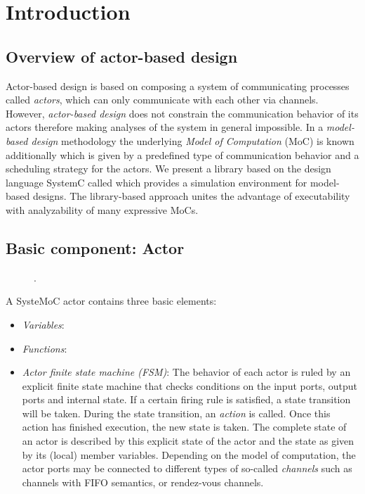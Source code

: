
\chapter{Introduction}

\section{Overview of actor-based design}
Actor-based design is based on composing a system of communicating processes called \emph{actors}, which can only communicate with each other via channels.
However, \emph{actor-based design} does not constrain the communication behavior of its actors therefore making analyses of the system in general impossible.
In a \emph{model-based design} methodology the underlying \emph{Model of Computation} (MoC) is known additionally which is given by a predefined type of communication behavior and a scheduling strategy for the actors.
We present a library based on the design language SystemC called \SysteMoC{} which provides a simulation environment for model-based designs.
The library-based approach unites the advantage of executability with analyzability of many expressive MoCs.

\section{Basic component: Actor}

\begin{figure}[h]
\centering

\caption {.
}
\label{fig:actor-scheme}
\end{figure}

A SysteMoC actor contains three basic elements:
\begin{itemize}
\item {\em Variables}:
\item {\em Functions}:
\item {\em Actor finite state machine (FSM)}:
The behavior of each actor is ruled 
by an explicit finite state machine that checks conditions on the input ports, 
output ports and internal state. If a certain firing rule is satisfied, 
a state transition will be taken. During the state transition, an {\em action}
is called. Once this action has finished execution, the new state is 
taken. The complete state of an actor is described by this explicit 
state of the actor and the state as given by its (local) member variables.
Depending on the model of computation, 
the actor ports may be connected to different types of so-called {\em channels} such 
as channels with FIFO semantics, or rendez-vous channels.
\end{itemize}

